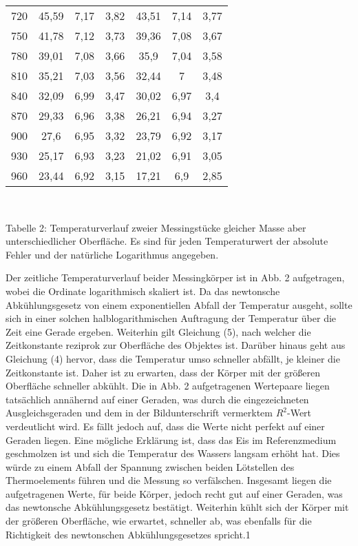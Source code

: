 \documentclass[a4paper]{article}
\begin{document}
\begin{center}
\begin{tabular}{l|ccc|ccc}
720 & 45,59 & 7,17 & 3,82 & 43,51 & 7,14 & 3,77\\
750 & 41,78 & 7,12 & 3,73 & 39,36 & 7,08 & 3,67\\
780 & 39,01 & 7,08 & 3,66 & 35,9 & 7,04 & 3,58\\
810 & 35,21 & 7,03 & 3,56 & 32,44 & 7 & 3,48\\
840 & 32,09 & 6,99 & 3,47 & 30,02 & 6,97 & 3,4\\
870 & 29,33 & 6,96 & 3,38 & 26,21 & 6,94 & 3,27\\
900 & 27,6 & 6,95 & 3,32 & 23,79 & 6,92 & 3,17\\
930 & 25,17 & 6,93 & 3,23 & 21,02 & 6,91 & 3,05\\
960 & 23,44 & 6,92 & 3,15 & 17,21 & 6,9 & 2,85\\
\end{tabular}\\
\end{center}
\begin{flushleft}
\small Tabelle 2: Temperaturverlauf zweier Messingstücke gleicher Masse aber unterschiedlicher Oberfläche. Es sind für jeden Temperaturwert der absolute Fehler und der natürliche Logarithmus angegeben.
\end{flushleft}
Der zeitliche Temperaturverlauf beider Messingkörper ist in Abb. 2 aufgetragen, wobei die Ordinate logarithmisch skaliert ist. Da das newtonsche Abkühlungsgesetz von einem exponentiellen Abfall der Temperatur ausgeht, sollte sich in einer solchen halblogarithmischen Auftragung der Temperatur über die Zeit eine Gerade ergeben. Weiterhin gilt Gleichung (5), nach welcher die Zeitkonstante reziprok zur Oberfläche des Objektes ist. Darüber hinaus geht aus Gleichung (4) hervor, dass die Temperatur umso schneller abfällt, je kleiner die Zeitkonstante ist. Daher ist zu erwarten, dass der Körper mit der größeren Oberfläche schneller abkühlt. Die in Abb. 2 aufgetragenen Wertepaare liegen tatsächlich annähernd auf einer Geraden, was durch die eingezeichneten Ausgleichsgeraden und dem in der Bildunterschrift vermerktem $R^2$-Wert verdeutlicht wird. Es fällt jedoch auf, dass die Werte nicht perfekt auf einer Geraden liegen. Eine mögliche Erklärung ist, dass das Eis im Referenzmedium geschmolzen ist und sich die Temperatur des Wassers langsam erhöht hat. Dies würde zu einem Abfall der Spannung zwischen beiden Lötstellen des Thermoelements führen und die Messung so verfälschen. Insgesamt liegen die aufgetragenen Werte, für beide Körper, jedoch recht gut auf einer Geraden, was das newtonsche Abkühlungsgesetz bestätigt. Weiterhin kühlt sich der Körper mit der größeren Oberfläche, wie erwartet, schneller ab, was ebenfalls für die Richtigkeit des newtonschen Abkühlungsgesetzes spricht.1
\end{document}
